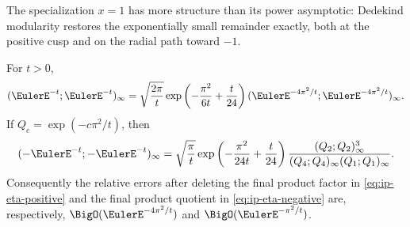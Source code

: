 The specialization \(x=1\) has more structure than its power asymptotic:
Dedekind modularity restores the exponentially small remainder exactly, both
at the positive cusp and on the radial path toward \(-1\).

\begin{theorem}[Exact eta completions at \(q=1\) and \(q=-1\)]
\label{thm:ip-eta-completions}
For \(t>0\),
\begin{equation}
 (\EulerE^{-t};\EulerE^{-t})_\infty
 =\sqrt{\frac{2\pi}{t}}
 \exp\left(-\frac{\pi^2}{6t}+\frac{t}{24}\right)
 (\EulerE^{-4\pi^2/t};\EulerE^{-4\pi^2/t})_\infty.
 \label{eq:ip-eta-positive}
\end{equation}
If \(Q_c=\exp(-c\pi^2/t)\), then
\begin{equation}
 (-\EulerE^{-t};-\EulerE^{-t})_\infty
 =\sqrt{\frac{\pi}{t}}
 \exp\left(-\frac{\pi^2}{24t}+\frac{t}{24}\right)
 \frac{(Q_2;Q_2)_\infty^3}
 {(Q_4;Q_4)_\infty(Q_1;Q_1)_\infty}.
 \label{eq:ip-eta-negative}
\end{equation}
Consequently the relative errors after deleting the final product factor in
\cref{eq:ip-eta-positive} and the final product quotient in
\cref{eq:ip-eta-negative} are, respectively,
\(\BigO(\EulerE^{-4\pi^2/t})\) and \(\BigO(\EulerE^{-\pi^2/t})\).
\end{theorem}


